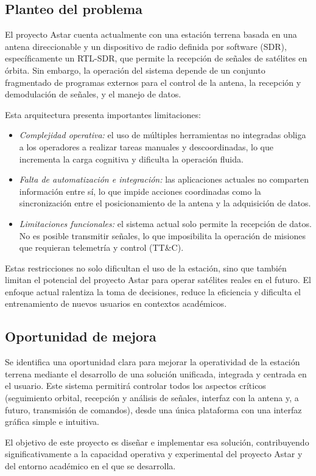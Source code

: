 \subsection*{Planteo del problema}

El proyecto Astar cuenta actualmente con una estación terrena basada en una antena direccionable y un dispositivo de radio definida por software (SDR), específicamente un RTL-SDR, que permite la recepción de señales de satélites en órbita. Sin embargo, la operación del sistema depende de un conjunto fragmentado de programas externos para el control de la antena, la recepción y demodulación de señales, y el manejo de datos.

Esta arquitectura presenta importantes limitaciones:

\begin{itemize}
    \item \textit{Complejidad operativa:} el uso de múltiples herramientas no integradas obliga a los operadores a realizar tareas manuales y descoordinadas, lo que incrementa la carga cognitiva y dificulta la operación fluida.
    
    \item \textit{Falta de automatización e integración:} las aplicaciones actuales no comparten información entre sí, lo que impide acciones coordinadas como la sincronización entre el posicionamiento de la antena y la adquisición de datos.
    
    \item \textit{Limitaciones funcionales:} el sistema actual solo permite la recepción de datos. No es posible transmitir señales, lo que imposibilita la operación de misiones que requieran telemetría y control (TT\&C).
\end{itemize}

Estas restricciones no solo dificultan el uso de la estación, sino que también limitan el potencial del proyecto Astar para operar satélites reales en el futuro. El enfoque actual ralentiza la toma de decisiones, reduce la eficiencia y dificulta el entrenamiento de nuevos usuarios en contextos académicos.

\subsection*{Oportunidad de mejora}

Se identifica una oportunidad clara para mejorar la operatividad de la estación terrena mediante el desarrollo de una solución unificada, integrada y centrada en el usuario. Este sistema permitirá controlar todos los aspectos críticos (seguimiento orbital, recepción y análisis de señales, interfaz con la antena y, a futuro, transmisión de comandos), desde una única plataforma con una interfaz gráfica simple e intuitiva.

El objetivo de este proyecto es diseñar e implementar esa solución, contribuyendo significativamente a la capacidad operativa y experimental del proyecto Astar y del entorno académico en el que se desarrolla.
